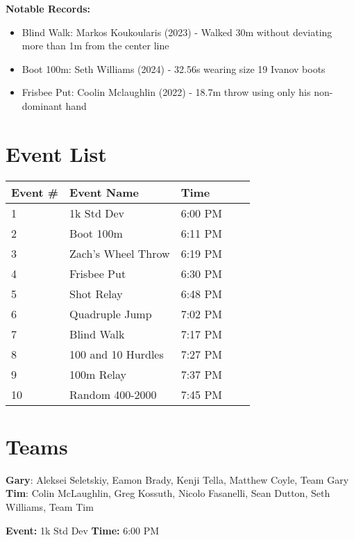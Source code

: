 \documentclass[10pt]{article}
\begin{document}
\vspace{0.5em}
\textbf{Notable Records:}
\begin{itemize}
  \item Blind Walk: Markos Koukoularis (2023) - Walked 30m without deviating more than 1m from the center line
  \item Boot 100m: Seth Williams (2024) - 32.56s wearing size 19 Ivanov boots
  \item Frisbee Put: Coolin Mclaughlin (2022) - 18.7m throw using only his non-dominant hand
\end{itemize}


\vspace{1em}

\section*{Event List}

\begin{tabular}{@{}lllll@{}}
\toprule
\textbf{Event \#} & \textbf{Event Name} &  \textbf{Time} \\
\midrule
1 & 1k Std Dev & 6:00 PM \\
2 & Boot 100m & 6:11 PM \\
3 & Zach's Wheel Throw & 6:19 PM \\
4 & Frisbee Put & 6:30 PM \\
5 & Shot Relay & 6:48 PM \\
6 & Quadruple Jump & 7:02 PM \\
7 & Blind Walk & 7:17 PM \\
8 & 100 and 10 Hurdles & 7:27 PM \\
9 & 100m Relay & 7:37 PM \\
10 & Random 400-2000 & 7:45 PM \\
\bottomrule
\end{tabular}


\vspace{2em}
\section*{Teams}

\textbf{Gary}: Aleksei Seletskiy, Eamon Brady, Kenji Tella, Matthew Coyle, Team Gary
\\\textbf{Tim}: Colin McLaughlin, Greg Kossuth, Nicolo Fasanelli, Sean Dutton, Seth Williams, Team Tim

\twocolumn


\textbf{Event:} 1k Std Dev \quad \textbf{Time:} 6:00 PM 
\end{document}
